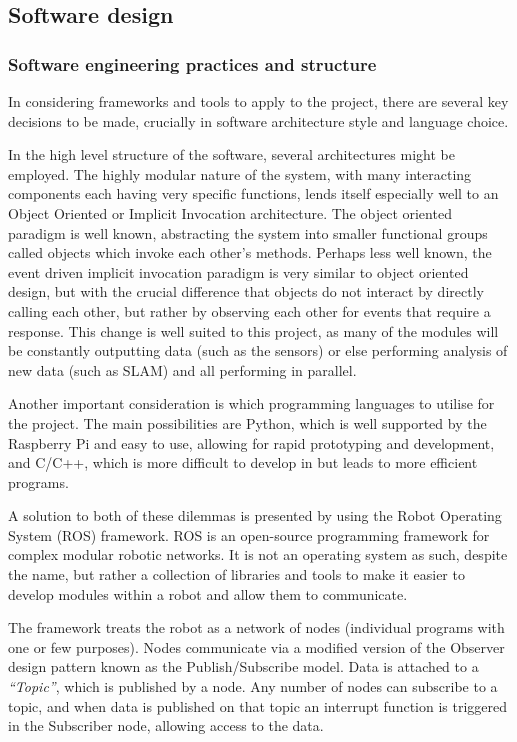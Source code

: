 \subsection{Software design}\label{design/software}

\subsubsection{Software engineering practices and structure}
In considering frameworks and tools to apply to the project, there are
several key decisions to be made, crucially in software architecture style
and language choice.

In the high level structure of the software, several architectures might be
employed. The highly modular nature of the system, with many interacting
components each having very specific functions, lends itself especially well
to an Object Oriented or Implicit Invocation architecture. The object
oriented paradigm is well known, abstracting the system into smaller
functional groups called objects which invoke each other's methods. Perhaps
less well known, the event driven implicit invocation paradigm is very
similar to object oriented design, but with the crucial difference that
objects do not interact by directly calling each other, but rather by
observing each other for events that require a response. This change is well
suited to this project, as many of the modules will be constantly outputting
data (such as the sensors) or else performing analysis of new data (such as
SLAM) and all performing in parallel.

Another important consideration is which programming languages to utilise for
the project. The main possibilities are Python, which is well supported by
the Raspberry Pi and easy to use, allowing for rapid prototyping and
development, and C/C++, which is more difficult to develop in but leads to
more efficient programs.

A solution to both of these dilemmas is presented by using the Robot
Operating System (ROS) framework. ROS is an open-source programming framework
for complex modular robotic networks. It is not an operating system as such,
despite the name, but rather a collection of libraries and tools to make it
easier to develop modules within a robot and allow them to communicate.

The framework treats the robot as a network of nodes (individual programs
with one or few purposes). Nodes communicate via a modified version of the
Observer design pattern known as the Publish/Subscribe model. Data is
attached to a \emph{``Topic''}, which is published by a node. Any number of
nodes can subscribe to a topic, and when data is published on that topic an
interrupt function is triggered in the Subscriber node, allowing access to
the data.

